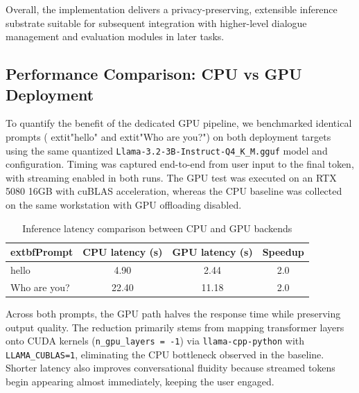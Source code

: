 \documentclass[12pt,a4paper]{article}
\begin{document}
Overall, the implementation delivers a privacy-preserving, extensible inference substrate suitable for subsequent integration with higher-level dialogue management and evaluation modules in later tasks.

\subsection{Performance Comparison: CPU vs GPU Deployment}

To quantify the benefit of the dedicated GPU pipeline, we benchmarked identical prompts (	extit{"hello"} and 	extit{"Who are you?"}) on both deployment targets using the same quantized \texttt{Llama-3.2-3B-Instruct-Q4\_K\_M.gguf} model and configuration. Timing was captured end-to-end from user input to the final token, with streaming enabled in both runs. The GPU test was executed on an RTX 5080 16GB with cuBLAS acceleration, whereas the CPU baseline was collected on the same workstation with GPU offloading disabled.

\begin{table}[H]
    \centering
    \caption{Inference latency comparison between CPU and GPU backends}
    \label{tab:cpu_gpu_latency}
    \begin{tabular}{|l|c|c|c|}
        \hline
        	extbf{Prompt} & \textbf{CPU latency (s)} & \textbf{GPU latency (s)} & \textbf{Speedup} \\
        \hline
        hello & 4.90 & 2.44 & 2.0\texttimes{} \\
        Who are you? & 22.40 & 11.18 & 2.0\texttimes{} \\
        \hline
    \end{tabular}
\end{table}

Across both prompts, the GPU path halves the response time while preserving output quality. The reduction primarily stems from mapping transformer layers onto CUDA kernels (\texttt{n\_gpu\_layers = -1}) via \texttt{llama-cpp-python} with \texttt{LLAMA\_CUBLAS=1}, eliminating the CPU bottleneck observed in the baseline. Shorter latency also improves conversational fluidity because streamed tokens begin appearing almost immediately, keeping the user engaged.
\end{document}
